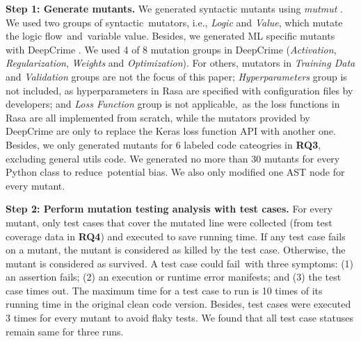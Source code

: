 \textbf{Step 1: Generate mutants.}
We generated syntactic mutants using \textit{mutmut} \cite{mutmut}. %
We used two groups of syntactic~mutators, i.e., \textit{Logic} and \textit{Value}, which mutate the logic flow~and~variable value. %
Besides, we generated ML specific mutants with DeepCrime \cite{DeepCrime}. 
We used 4 of 8 mutation groups in DeepCrime (\textit{Activation}, \textit{Regularization}, \textit{Weights} and \textit{Optimization}). For others, mutators in \textit{Training Data} and \textit{Validation} groups are not the focus of this paper; \textit{Hyperparameters} group is not included, as hyperparameters in Rasa are specified with configuration files by developers; and \textit{Loss Function} group is not applicable,~as the loss functions in Rasa are all implemented from scratch, while the mutators provided by DeepCrime are only to replace the Keras loss function API with another one. Besides, we only generated mutants for 6 labeled code cateogries in \textbf{RQ3}, excluding general utils code. We generated no more than 30 mutants for every Python class to reduce~potential bias. We also only modified one AST node for every mutant.

\textbf{Step 2: Perform mutation testing analysis with test cases.} For every mutant, only test cases that cover the mutated line were collected (from test coverage data in \textbf{RQ4}) and executed to save running time. %
If any test case fails on a mutant, the mutant is considered as killed by the test case. Otherwise, the mutant is considered as survived. 
A test case could fail~with three symptoms: (1) an assertion fails; (2) an execution or runtime error manifests; and (3) the test case times out. 
The maximum time for a test case to run is 10 times of its running time in the original clean code version. 
Besides, test cases were executed 3 times for every mutant to avoid flaky tests. We found that all test case statuses remain same for three runs. 

